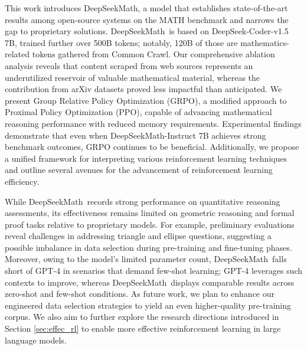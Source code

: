 This work introduces DeepSeekMath, a model that establishes state-of-the-art results among open-source systems on the MATH benchmark and narrows the gap to proprietary solutions. DeepSeekMath~is based on DeepSeek-Coder-v1.5 7B, trained further over 500B tokens; notably, 120B of those are mathematics-related tokens gathered from Common Crawl. Our comprehensive ablation analysis reveals that content scraped from web sources represents an underutilized reservoir of valuable mathematical material, whereas the contribution from arXiv datasets proved less impactful than anticipated. We present Group Relative Policy Optimization (GRPO), a modified approach to Proximal Policy Optimization (PPO), capable of advancing mathematical reasoning performance with reduced memory requirements. Experimental findings demonstrate that even when DeepSeekMath-Instruct 7B achieves strong benchmark outcomes, GRPO continues to be beneficial. Additionally, we propose a unified framework for interpreting various reinforcement learning techniques and outline several avenues for the advancement of reinforcement learning efficiency.

While DeepSeekMath~records strong performance on quantitative reasoning assessments, its effectiveness remains limited on geometric reasoning and formal proof tasks relative to proprietary models. For example, preliminary evaluations reveal challenges in addressing triangle and ellipse questions, suggesting a possible imbalance in data selection during pre-training and fine-tuning phases. Moreover, owing to the model’s limited parameter count, DeepSeekMath~falls short of GPT-4 in scenarios that demand few-shot learning; GPT-4 leverages such contexts to improve, whereas DeepSeekMath~displays comparable results across zero-shot and few-shot conditions. As future work, we plan to enhance our engineered data selection strategies to yield an even higher-quality pre-training corpus. We also aim to further explore the research directions introduced in Section \ref{sec:effec_rl} to enable more effective reinforcement learning in large language models.

